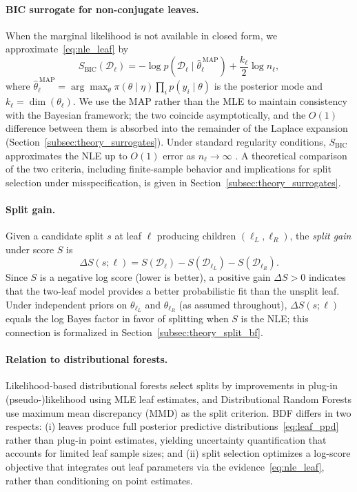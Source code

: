 \documentclass[twoside,11pt]{article}
\begin{document}
\paragraph{BIC surrogate for non-conjugate leaves.}
When the marginal likelihood is not available in closed form, we approximate~\eqref{eq:nle_leaf} by
\begin{equation}\label{eq:bic_leaf}
S_{\mathrm{BIC}}(\mathcal{D}_\ell)
=
-\log p(\mathcal{D}_\ell \mid \hat{\theta}_\ell^{\,\mathrm{MAP}})
+
\frac{k_\ell}{2}\log n_\ell,
\end{equation}
where $\hat{\theta}_\ell^{\,\mathrm{MAP}} = \arg\max_\theta \pi(\theta \mid \eta) \prod_i p(y_i \mid \theta)$ is the posterior mode and $k_\ell = \dim(\theta_\ell)$. We use the MAP rather than the MLE to maintain consistency with the Bayesian framework; the two coincide asymptotically, and the $O(1)$ difference between them is absorbed into the remainder of the Laplace expansion (Section~\ref{subsec:theory_surrogates}). Under standard regularity conditions, $S_{\mathrm{BIC}}$ approximates the NLE up to $O(1)$ error as $n_\ell \to \infty$ \citep{schwarz1978estimating}. A theoretical comparison of the two criteria, including finite-sample behavior and implications for split selection under misspecification, is given in Section~\ref{subsec:theory_surrogates}.

\paragraph{Split gain.}
Given a candidate split $s$ at leaf $\ell$ producing children $(\ell_L,\ell_R)$, the \emph{split gain} under score $S$ is
\begin{equation}\label{eq:split_gain}
\Delta S(s;\ell)
=
S(\mathcal{D}_\ell) - S(\mathcal{D}_{\ell_L}) - S(\mathcal{D}_{\ell_R}).
\end{equation}
Since $S$ is a negative log score (lower is better), a positive gain $\Delta S > 0$ indicates that the two-leaf model provides a better probabilistic fit than the unsplit leaf. Under independent priors on $\theta_{\ell_L}$ and $\theta_{\ell_R}$ (as assumed throughout), $\Delta S(s;\ell)$ equals the log Bayes factor in favor of splitting when $S$ is the NLE; this connection is formalized in Section~\ref{subsec:theory_split_bf}.

\paragraph{Relation to distributional forests.}
Likelihood-based distributional forests \citep{schlosser2019distributional} select splits by improvements in plug-in (pseudo-)likelihood using MLE leaf estimates, and Distributional Random Forests \citep[DRF;][]{cevid2022distributional} use maximum mean discrepancy (MMD) as the split criterion. BDF differs in two respects: (i) leaves produce full posterior predictive distributions~\eqref{eq:leaf_ppd} rather than plug-in point estimates, yielding uncertainty quantification that accounts for limited leaf sample sizes; and (ii) split selection optimizes a log-score objective that integrates out leaf parameters via the evidence~\eqref{eq:nle_leaf}, rather than conditioning on point estimates.
\end{document}

